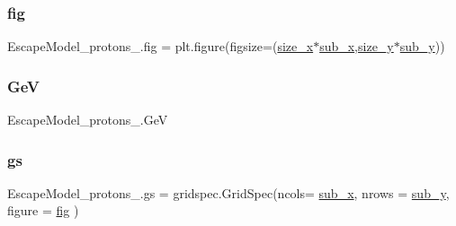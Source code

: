 \subsubsection{\texorpdfstring{fig}{fig}}
{\footnotesize\ttfamily Escape\+Model\+\_\+protons\+\_.\+fig = plt.\+figure(figsize=(\hyperlink{namespaceEscapeModel__protons__2_ac08e47354c7012b47a21c29fb73f2463}{size\+\_\+x}$\ast$\hyperlink{namespaceEscapeModel__protons__2_a799ad0706a435c1ea37e8a7a83eba68c}{sub\+\_\+x},\hyperlink{namespaceEscapeModel__protons__2_a02f2dcd8486eb2dcb27586989af55827}{size\+\_\+y}$\ast$\hyperlink{namespaceEscapeModel__protons__2_aac43310b10312443e458577ea9d77a1a}{sub\+\_\+y}))}

\mbox{\label{namespaceEscapeModel__protons__2_a2bc06724f2b8a0c43eb07274776fab7b}} 
\subsubsection{\texorpdfstring{GeV}{GeV}}
{\footnotesize\ttfamily Escape\+Model\+\_\+protons\+\_.\+GeV}

\mbox{\label{namespaceEscapeModel__protons__2_ac78144ff63b1cfafc81865301d7900d4}} 
\subsubsection{\texorpdfstring{gs}{gs}}
{\footnotesize\ttfamily Escape\+Model\+\_\+protons\+\_.\+gs = gridspec.\+Grid\+Spec(ncols= \hyperlink{namespaceEscapeModel__protons__2_a799ad0706a435c1ea37e8a7a83eba68c}{sub\+\_\+x}, nrows = \hyperlink{namespaceEscapeModel__protons__2_aac43310b10312443e458577ea9d77a1a}{sub\+\_\+y}, figure = \hyperlink{namespaceEscapeModel__protons__2_ab9e89e306207ef87dfe97dcc618ba79f}{fig} )}

\mbox{\label{namespaceEscapeModel__protons__2_a15441b30802074923e94f3ce5b49f0ee}} 

